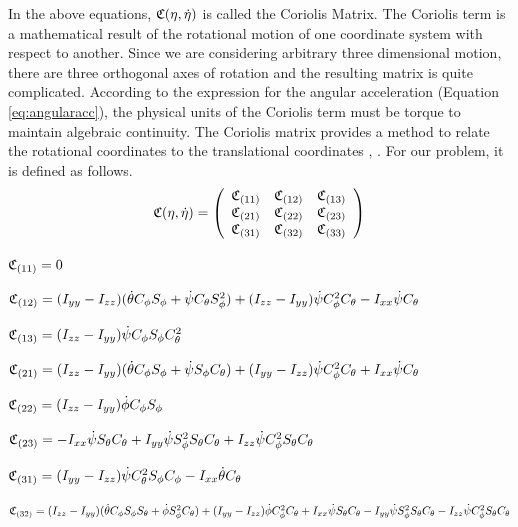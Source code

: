 In the above equations, $\mathfrak{C}(\eta,\dot{\eta})$ is called the Coriolis Matrix. The Coriolis term is a mathematical result of the rotational motion of one coordinate system with respect to another. Since we are considering arbitrary three dimensional motion, there are three orthogonal axes of rotation and the resulting matrix is quite complicated. According to the expression for the angular acceleration (Equation \eqref{eq:angularacc}), the physical units of the Coriolis term must be torque to maintain algebraic continuity. The Coriolis matrix provides a method to relate the rotational coordinates to the translational coordinates \cite{Coriolis}, \cite{Hestenes}. For our problem, it is defined as follows.
\begin{equation}
\label{cor}
    \cc(\eta,\dot{\eta}) =
    \left(
        \begin{array}{c c c}
            \cc_{(11)} & \cc_{(12)} & \cc_{(13)} \\
            \cc_{(21)} & \cc_{(22)} & \cc_{(23)} \\
            \cc_{(31)} & \cc_{(32)} & \cc_{(33)} \\
        \end{array}
    \right)
\end{equation}




$\mathfrak{C}_{(11)} = 0$

$\mathfrak{C}_{(12)}  = (I_{yy}-I_{zz})  ( \dot{\theta} C_{\phi} S_{\phi} +  \dot{\psi} C_{\theta} S_{\phi}^2 )  + (I_{zz}-I_{yy})  \dot{\psi} C_{\phi}^2 C_{\theta} - I_{xx}  \dot{\psi} C_{\theta}$


$\mathfrak{C}_{(13)} = (I_{zz}-I_{yy})    \dot{\psi}   C_{\phi}   S_{\phi}  C_{\theta}^2$


$\mathfrak{C}_{(21)} = (I_{zz}-I_{yy})   ( \dot{\theta} C_{\phi} S_{\phi} +  \dot{\psi} S_{\phi} C_{\theta} ) + (I_{yy}-I_{zz})    \dot{\psi}   C_{\phi}^2  C_{\theta} + I_{xx}    \dot{\psi}   C_{\theta}$


$\mathfrak{C}_{(22)}  = (I_{zz}-I_{yy}) \dot{\phi} C_{\phi} S_{\phi}$


$\mathfrak{C}_{(23)}  = -I_{xx}  \dot{\psi} S_{\theta} C_{\theta} + I_{yy}  \dot{\psi} S_{\phi}^2 S_{\theta} C_{\theta} + I_{zz} \dot{\psi} C_{\phi}^2 S_{\theta} C_{\theta}$


$\mathfrak{C}_{(31)} = (I_{yy}-I_{zz}) \dot{\psi} C_{\theta}^2 S_{\phi} C_{\phi} - I_{xx} \dot{\theta} C_{\theta}$


$\mathfrak{C}_{(32)}  = (I_{zz}-I_{yy}) ( \dot{\theta} C_{\phi} S_{\phi} S_{\theta} + \dot{\phi} S_{\phi}^2 C_{\theta} ) + (I_{yy}-I_{zz}) \dot{\phi} C_{\phi}^2 C_{\theta} + I_{xx}  \dot{\psi} S_{\theta} C_{\theta} - I_{yy}  \dot{\psi} S_{\phi}^2 S_{\theta} C_{\theta} - I_{zz}  \dot{\psi} C_{\phi}^2 S_{\theta} C_{\theta}$


